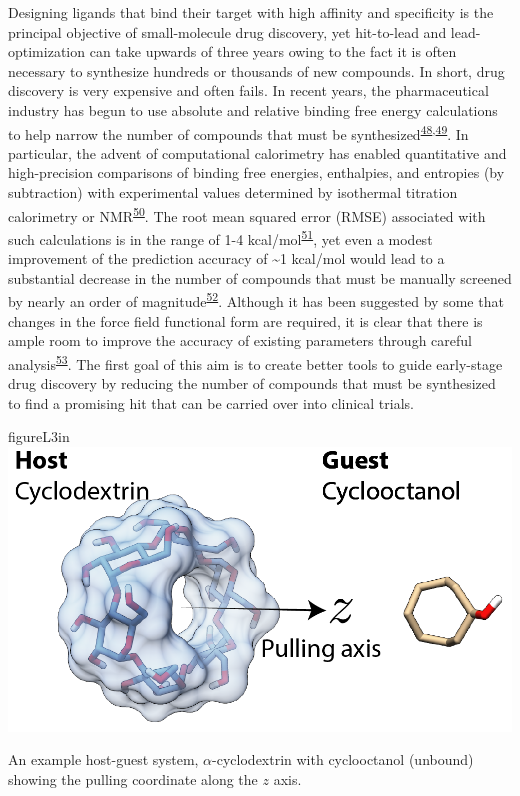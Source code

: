 \documentclass[11pt,notitlepage]{article}
\begin{document}
Designing ligands that bind their target with high affinity and
specificity is the principal objective of small-molecule drug discovery,
yet hit-to-lead and lead-optimization can take upwards of three years
owing to the fact it is often necessary to synthesize hundreds or
thousands of new compounds. In short, drug discovery is very expensive
and often fails. In recent years, the pharmaceutical industry has begun
to use absolute and relative binding free energy calculations to help
narrow the number of compounds that must be
synthesized\textsuperscript{\protect\hyperlink{ref-1FiDpP1LR}{48},\protect\hyperlink{ref-1BwXH3GFO}{49}}.
In particular, the advent of computational calorimetry has enabled
quantitative and high-precision comparisons of binding free energies,
enthalpies, and entropies (by subtraction) with experimental values
determined by isothermal titration calorimetry or
NMR\textsuperscript{\protect\hyperlink{ref-1935a9V0d}{50}}. The root
mean squared error (RMSE) associated with such calculations is in the
range of 1-4
kcal/mol\textsuperscript{\protect\hyperlink{ref-LWd10vQy}{51}}, yet even
a modest improvement of the prediction accuracy of \textasciitilde{}1
kcal/mol would lead to a substantial decrease in the number of compounds
that must be manually screened by nearly an order of
magnitude\textsuperscript{\protect\hyperlink{ref-fC0t6Cy1}{52}}.
Although it has been suggested by some that changes in the force field
functional form are required, it is clear that there is ample room to
improve the accuracy of existing parameters through careful
analysis\textsuperscript{\protect\hyperlink{ref-LOjcxYqt}{53}}. The
first goal of this aim is to create better tools to guide early-stage
drug discovery by reducing the number of compounds that must be
synthesized to find a promising hit that can be carried over into
clinical trials.


\begin{wrapfloat}{figure}{L}{3in}
\centering
\includegraphics{content/images/APR-annotated.png}
\caption{An example host-guest system, \(\alpha\)-cyclodextrin with
cyclooctanol (unbound) showing the pulling coordinate along the \(z\)
axis.}
\label{fig:apr}
\end{wrapfloat}
\end{document}
